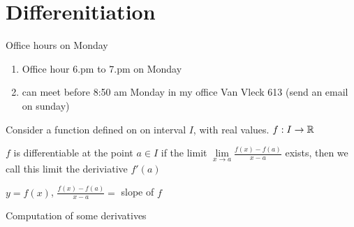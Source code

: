 \chapter{Differenitiation}

Office hours on Monday

\begin{enumerate}
  \item Office hour 6.pm to 7.pm on Monday
  \item can meet before 8:50 am Monday in my office Van Vleck 613 (send an email on sunday)
\end{enumerate}

Consider a function defined on on interval $I$, with real values.
$f: I \to \mathbb R$

\begin{definition*}
  $f$ is differentiable at the point $a \in I$ if the limit $\lim\limits_{x \to a} \frac{f(x) - f(a)}{x - a}$  exists,
  then we call this limit the deriviative $f'(a)$
\end{definition*}

\begin{center}

  $y = f(x)$, $\frac{f(x) - f(a)}{x-a} = $ slope of $f$
\end{center}

Computation of some derivatives

